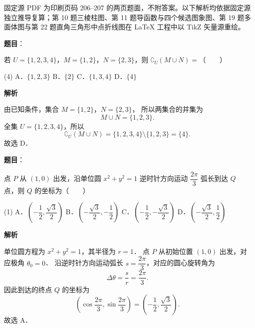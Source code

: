 

\begin{gktip}
固定源 PDF 为印刷页码 206–207 的两页题面，不附答案。以下解析均依据固定源独立推导复算；第 10 题三棱柱图、第 11 题导函数与四个候选图象图、第 19 题多面体图与第 22 题直角三角形中点折线图在 LaTeX 工程中以 TikZ 矢量源重绘。
\end{gktip}

\begin{answer}

\textbf{题目}：

若 $U = \{1, 2, 3, 4\}$，$M = \{1, 2\}$，$N = \{2, 3\}$，则 $\complement_U (M \cup N) =$\mbox{（　　）}

\begin{gkopts}(4)
\task A．$\{1, 2, 3\}$
\task B．$\{2\}$
\task C．$\{1, 3, 4\}$
\task D．$\{4\}$
\end{gkopts}

\textbf{解析}

由已知条件，集合 $M = \{1, 2\}$，$N = \{2, 3\}$，
所以两集合的并集为
\nopagebreak[4]
\[
M \cup N = \{1, 2, 3\}.
\]
全集 $U = \{1, 2, 3, 4\}$，所以
\nopagebreak[4]
\[
\complement_U (M \cup N) = \{1, 2, 3, 4\} \setminus \{1, 2, 3\} = \{4\}.
\]
故选 D．


\end{answer}
\begin{answer}

\textbf{题目}：

点 $P$ 从 $(1, 0)$ 出发，沿单位圆 $x^2 + y^2 = 1$ 逆时针方向运动 $\dfrac{2\pi}{3}$ 弧长到达 $Q$ 点，则 $Q$ 的坐标为\mbox{（　　）}

\begin{gkopts}(1)
\task A．$\left(-\dfrac{1}{2}, \dfrac{\sqrt{3}}{2}\right)$
\task B．$\left(-\dfrac{\sqrt{3}}{2}, -\dfrac{1}{2}\right)$
\task C．$\left(-\dfrac{1}{2}, -\dfrac{\sqrt{3}}{2}\right)$
\task D．$\left(-\dfrac{\sqrt{3}}{2}, \dfrac{1}{2}\right)$
\end{gkopts}

\textbf{解析}

单位圆方程为 $x^2 + y^2 = 1$，其半径为 $r = 1$．
点 $P$ 从初始位置 $(1, 0)$ 出发，对应极角 $\theta_0 = 0$．
沿逆时针方向运动弧长 $s = \dfrac{2\pi}{3}$，对应的圆心旋转角为
\nopagebreak[4]
\[
\Delta\theta = \frac{s}{r} = \frac{2\pi}{3}.
\]
因此到达的终点 $Q$ 的坐标为
\nopagebreak[4]
\[
\left(\cos\frac{2\pi}{3}, \sin\frac{2\pi}{3}\right) = \left(-\frac{1}{2}, \frac{\sqrt{3}}{2}\right).
\]
故选 A．


\end{answer}
